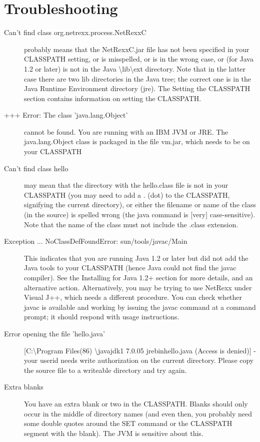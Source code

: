 \chapter{Troubleshooting\label{troubleshooting}}
\begin{description} 
\item[Can't find class org.netrexx.process.NetRexxC]
  probably means that the NetRexxC.jar file has not been specified in
  your CLASSPATH setting, or is misspelled, or is in the wrong case,
  or (for Java 1.2 or later) is not in the Java
  \textbackslash lib\textbackslash ext directory. Note that in the latter case there are two lib directories in the Java tree; the correct one is in the Java Runtime Environment directory (jre).
The Setting the CLASSPATH section contains information on setting the CLASSPATH.
\item[+++ Error: The class 'java.lang.Object'] cannot be found. You are running with an IBM JVM or JRE. The java.lang.Object class is packaged in the file vm.jar, which needs to be on your CLASSPATH
\item[Can't find class hello] may mean that the directory with the hello.class file is not in your CLASSPATH (you may need to add a . (dot) to the CLASSPATH, signifying the current directory), or either the filename or name of the class (in the source) is spelled wrong (the java command is [very] case-sensitive). Note that the name of the class must not include the .class extension.
\item[Exception ... NoClassDefFoundError: sun/tools/javac/Main] This indicates that you are running Java 1.2 or later but did not add the Java tools to your CLASSPATH (hence Java could not find the javac compiler). See the Installing for Java 1.2+ section for more details, and an alternative action.
Alternatively, you may be trying to use NetRexx under Visual J++, which needs a different procedure. You can check whether javac is available and working by issuing the javac command at a command prompt; it should respond with usage instructions.
\item[Error opening the file 'hello.java'][C:\textbackslash Program Files(86) \textbackslash javajdk1 7.0.05 jrebinhello.java (Access is denied)] - your userid needs write authorization on the current directory. Please copy the source file to a writeable directory and try again.
\item[Extra blanks] You have an extra blank or two in the CLASSPATH. Blanks should only occur in the middle of directory names (and even then, you probably need some double quotes around the SET command or the CLASSPATH segment with the blank). The JVM is sensitive about this.

\end{description}
